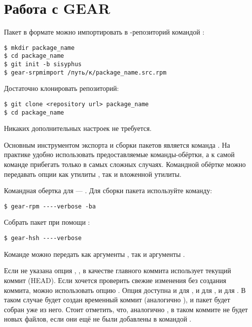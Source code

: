 \section{Работа с GEAR}


Пакет в формате  можно импортировать в -репозиторий командой :
\begin{verbatim}
$ mkdir package_name
$ cd package_name
$ git init -b sisyphus
$ gear-srpmimport /путь/к/package_name.src.rpm
\end{verbatim}


Достаточно клонировать репозиторий:
\begin{verbatim}
$ git clone <repository url> package_name
$ cd package_name
\end{verbatim}
Никаких дополнительных настроек не требуется.


Основным инструментом экспорта и сборки пакетов является команда . На практике удобно
использовать предоставляемые команды-обёртки, а к самой команде  прибегать только в
самых сложных случаях. Командной обёртке можно передавать опции как утилиты , так и
вложенной утилиты.

Командная обертка  для  --- . Для сборки пакета используйте команду:
\begin{verbatim}
$ gear-rpm ----verbose -ba
\end{verbatim}


Собрать пакет при помощи :
\begin{verbatim}
$ gear-hsh ----verbose
\end{verbatim}

Команде  можно передать как аргументы , так и аргументы .

Если не указана опция , , в качестве главного коммита использует текущий
коммит (HEAD). Если хочется проверить свежие изменения без создания коммита, можно использовать опцию
. Опция  доступна и для , и для , и для . В таком случае
будет создан временный коммит (аналогично ), и пакет будет собран уже из него.
Стоит отметить, что, аналогично , в таком коммите не будет новых файлов, если они
ещё не были добавлены в  командой .

